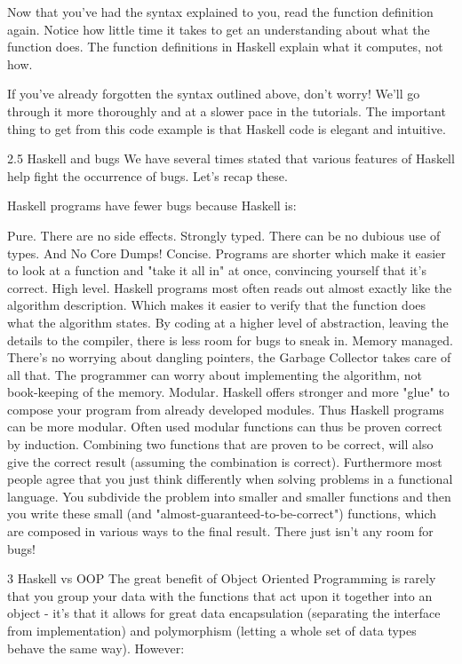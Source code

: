 \documentclass[main.tex]{subfiles}
\begin{document}
{{Now that you've had the syntax explained to you, read the function definition again. Notice how little time it takes to get an understanding about what the function does. The function definitions in Haskell explain what it computes, not how.

If you've already forgotten the syntax outlined above, don't worry! We'll go through it more thoroughly and at a slower pace in the tutorials. The important thing to get from this code example is that Haskell code is elegant and intuitive.

2.5 Haskell and bugs
We have several times stated that various features of Haskell help fight the occurrence of bugs. Let's recap these.

Haskell programs have fewer bugs because Haskell is:

Pure. There are no side effects.
Strongly typed. There can be no dubious use of types. And No Core Dumps!
Concise. Programs are shorter which make it easier to look at a function and "take it all in" at once, convincing yourself that it's correct.
High level. Haskell programs most often reads out almost exactly like the algorithm description. Which makes it easier to verify that the function does what the algorithm states. By coding at a higher level of abstraction, leaving the details to the compiler, there is less room for bugs to sneak in.
Memory managed. There's no worrying about dangling pointers, the Garbage Collector takes care of all that. The programmer can worry about implementing the algorithm, not book-keeping of the memory.
Modular. Haskell offers stronger and more "glue" to compose your program from already developed modules. Thus Haskell programs can be more modular. Often used modular functions can thus be proven correct by induction. Combining two functions that are proven to be correct, will also give the correct result (assuming the combination is correct).
Furthermore most people agree that you just think differently when solving problems in a functional language. You subdivide the problem into smaller and smaller functions and then you write these small (and "almost-guaranteed-to-be-correct") functions, which are composed in various ways to the final result. There just isn't any room for bugs!


3 Haskell vs OOP
The great benefit of Object Oriented Programming is rarely that you group your data with the functions that act upon it together into an object - it's that it allows for great data encapsulation (separating the interface from implementation) and polymorphism (letting a whole set of data types behave the same way). However:

}}
\end{document}

